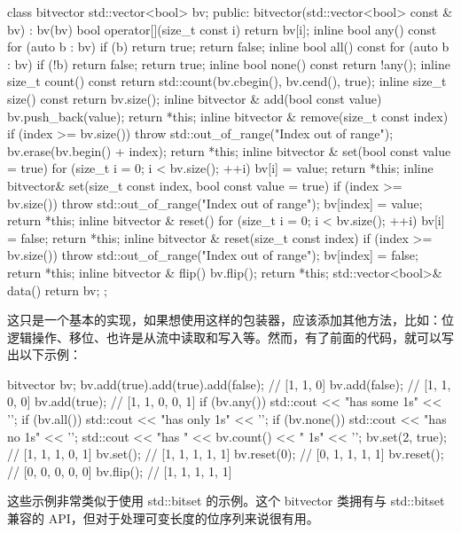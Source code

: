 \begin{cpp}
class bitvector
{
    std::vector<bool> bv;
    public:
    bitvector(std::vector<bool> const & bv) : bv(bv) {}
    bool operator[](size_t const i) { return bv[i]; }
    inline bool any() const {
        for (auto b : bv) if (b) return true;
        return false;
    }
    inline bool all() const {
        for (auto b : bv) if (!b) return false;
        return true;
    }
    inline bool none() const { return !any(); }
    inline size_t count() const {
        return std::count(bv.cbegin(), bv.cend(), true);
    }
    inline size_t size() const { return bv.size(); }
    inline bitvector & add(bool const value) {
        bv.push_back(value);
        return *this;
    }
    inline bitvector & remove(size_t const index) {
        if (index >= bv.size())
        throw std::out_of_range("Index out of range");
        bv.erase(bv.begin() + index);
        return *this;
    }
    inline bitvector & set(bool const value = true) {
        for (size_t i = 0; i < bv.size(); ++i)
        bv[i] = value;
        return *this;
    }
    inline bitvector& set(size_t const index, bool const value = true) {
        if (index >= bv.size())
        throw std::out_of_range("Index out of range");
        bv[index] = value;
        return *this;
    }
    inline bitvector & reset() {
        for (size_t i = 0; i < bv.size(); ++i) bv[i] = false;
        return *this;
    }
    inline bitvector & reset(size_t const index) {
        if (index >= bv.size())
        throw std::out_of_range("Index out of range");
        bv[index] = false;
        return *this;
    }
    inline bitvector & flip() {
        bv.flip();
        return *this;
    }
    std::vector<bool>& data() { return bv; }
};
\end{cpp}

这只是一个基本的实现，如果想使用这样的包装器，应该添加其他方法，比如：位逻辑操作、移位、也许是从流中读取和写入等。然而，有了前面的代码，就可以写出以下示例：

\begin{cpp}
bitvector bv;
bv.add(true).add(true).add(false); // [1, 1, 0]
bv.add(false);                     // [1, 1, 0, 0]
bv.add(true);                      // [1, 1, 0, 0, 1]
if (bv.any()) std::cout << "has some 1s" << '\n';
if (bv.all()) std::cout << "has only 1s" << '\n';
if (bv.none()) std::cout << "has no 1s" << '\n';
std::cout << "has " << bv.count() << " 1s" << '\n';
bv.set(2, true);                   // [1, 1, 1, 0, 1]
bv.set();                          // [1, 1, 1, 1, 1]
bv.reset(0);                       // [0, 1, 1, 1, 1]
bv.reset();                        // [0, 0, 0, 0, 0]
bv.flip();                         // [1, 1, 1, 1, 1]
\end{cpp}

这些示例非常类似于使用 std::bitset 的示例。这个 bitvector 类拥有与 std::bitset 兼容的 API，但对于处理可变长度的位序列来说很有用。

